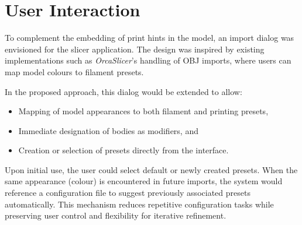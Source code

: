 \section{User Interaction}

To complement the embedding of print hints in the model, an import dialog was envisioned for the slicer application. 
The design was inspired by existing implementations such as \textit{OrcaSlicer}’s handling of OBJ imports, where users can map model colours to filament presets.

In the proposed approach, this dialog would be extended to allow:

\begin{itemize}
  \item Mapping of model appearances to both filament and printing presets,
  \item Immediate designation of bodies as modifiers, and
  \item Creation or selection of presets directly from the interface.
\end{itemize}

Upon initial use, the user could select default or newly created presets. 
When the same appearance (colour) is encountered in future imports, the system would reference a configuration file to suggest previously associated presets automatically. 
This mechanism reduces repetitive configuration tasks while preserving user control and flexibility for iterative refinement.
